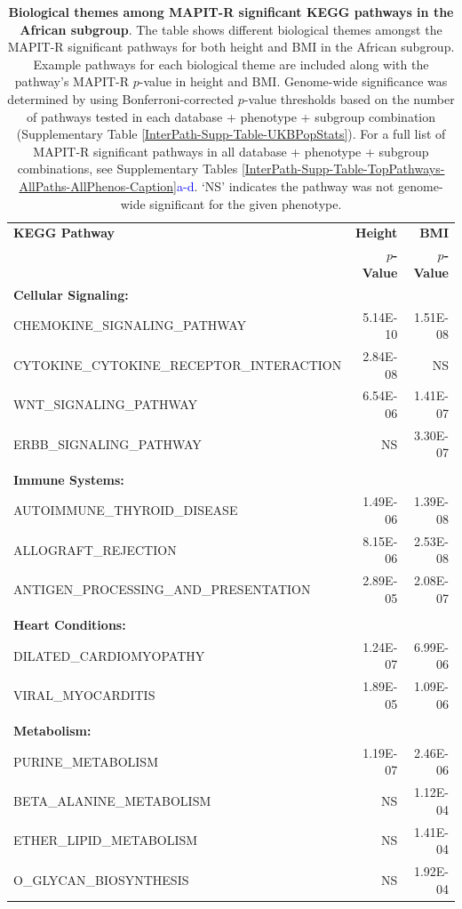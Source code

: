 \documentclass[12pt,a4paper]{article}
\begin{document}
\begin{table}[ht]
\centering
\begin{tabular}{lrr}
  \hline
\textbf{KEGG Pathway} & \textbf{Height} & \textbf{BMI} \\ 
& \textbf{$p$-Value} & \textbf{$p$-Value} \\ 
  \hline
  \textbf{Cellular Signaling:} & & \\
 CHEMOKINE\_SIGNALING\_PATHWAY & 5.14E-10 & 1.51E-08 \\
 CYTOKINE\_CYTOKINE\_RECEPTOR\_INTERACTION & 2.84E-08 & NS \\
 WNT\_SIGNALING\_PATHWAY & 6.54E-06 & 1.41E-07 \\
 ERBB\_SIGNALING\_PATHWAY & NS & 3.30E-07 \\
  \\
  \textbf{Immune Systems:} & & \\
  AUTOIMMUNE\_THYROID\_DISEASE & 1.49E-06 & 1.39E-08 \\
  ALLOGRAFT\_REJECTION & 8.15E-06 & 2.53E-08 \\
  ANTIGEN\_PROCESSING\_AND\_PRESENTATION & 2.89E-05 & 2.08E-07 \\
  \\
  \textbf{Heart Conditions:} & & \\
  DILATED\_CARDIOMYOPATHY & 1.24E-07 & 6.99E-06 \\
  VIRAL\_MYOCARDITIS & 1.89E-05 & 1.09E-06 \\
  \\
  \textbf{Metabolism:} & & \\
  PURINE\_METABOLISM & 1.19E-07 & 2.46E-06 \\
  BETA\_ALANINE\_METABOLISM & NS & 1.12E-04 \\
  ETHER\_LIPID\_METABOLISM & NS & 1.41E-04 \\
  O\_GLYCAN\_BIOSYNTHESIS & NS & 1.92E-04 \\
   \hline
\end{tabular}
  \caption{\textbf{Biological themes among MAPIT-R significant KEGG pathways in the African subgroup}. The table shows different biological themes amongst the MAPIT-R significant pathways for both height and BMI in the African subgroup. Example pathways for each biological theme are included along with the pathway's MAPIT-R $p$-value in height and BMI. Genome-wide significance was determined by using Bonferroni-corrected $p$-value thresholds based on the number of pathways tested in each database + phenotype + subgroup combination (Supplementary Table \ref{InterPath-Supp-Table-UKBPopStats}). For a full list of MAPIT-R significant pathways in all database + phenotype + subgroup combinations, see Supplementary Tables \ref{InterPath-Supp-Table-TopPathways-AllPaths-AllPhenos-Caption}\textcolor{blue}{a-d}. `NS' indicates the pathway was not genome-wide significant for the given phenotype.}
\label{InterPath-Main-Table-KEGG-African-TopPathways-Themes}
\end{table}
\end{document}
